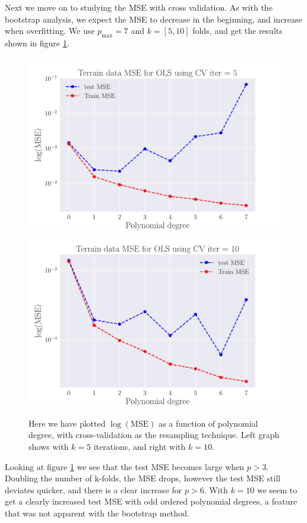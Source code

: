 \documentclass[reprint,english,notitlepage,aps,nobalancelastpage,nofootinbib]{revtex4-1}  %
\begin{document}
Next we move on to studying the MSE with cross validation. As with the bootstrap analysis, we expect the MSE to decrease in the beginning, and increase when overfitting. We use $p_\text{max} = 7$ and $k=[5,10]$ folds, and get the results shown in figure \ref{fig:terrain_OLS_MSE_CV}.

\begin{figure}[h]
	\includegraphics[width=\linewidth]{SRTM_MSE_OLS_n50_pol7_CV_re5_log.pdf}
	\endminipage\hfill
	\includegraphics[width=\linewidth]{SRTM_MSE_OLS_n50_pol7_CV_re10_log.pdf}
	\endminipage
	\caption{Here we have plotted $\log(\text{MSE})$ as a function of polynomial degree, with cross-validation as the resampling technique. Left graph shows with $k=5$ iterations, and right with $k=10$.}
  \label{fig:terrain_OLS_MSE_CV}
\end{figure}
Looking at figure \ref{fig:terrain_OLS_MSE_CV} we see that the test MSE becomes large when $p>3$. Doubling the number of k-folds, the MSE drops, however the test MSE still deviates quicker, and there is a clear increase for $p>6$. With $k=10$ we seem to get a clearly increased test MSE with odd ordered polynomial degrees, a feature that was not apparent with the bootstrap method.
\end{document}
